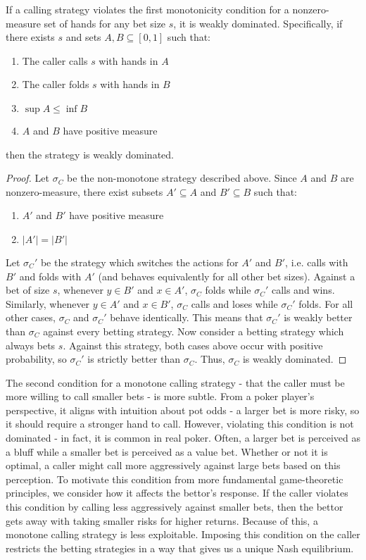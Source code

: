 \documentclass[../../main/main.tex]{subfiles}
\begin{document}
\begin{lemma}
    \label{lem:monotone_dominated}
    If a calling strategy violates the first monotonicity condition for a nonzero-measure set of hands for any bet size $s$, it is weakly dominated. Specifically, if there exists $s$ and sets $A, B \subseteq [0, 1]$ such that:
    \begin{enumerate}
        \item The caller calls $s$ with hands in $A$
        \item The caller folds $s$ with hands in $B$
        \item $\sup A \leq \inf B$
        \item $A$ and $B$ have positive measure
    \end{enumerate}
    then the strategy is weakly dominated.
\end{lemma}
\begin{proof}
    Let $\sigma_C$ be the non-monotone strategy described above. Since $A$ and $B$ are nonzero-measure, there exist subsets $A' \subseteq A$ and $B' \subseteq B$ such that:
    \begin{enumerate}
        \item $A'$ and $B'$ have positive measure
        \item $|A'| = |B'|$
    \end{enumerate}
    Let $\sigma_C'$ be the strategy which switches the actions for $A'$ and $B'$, i.e. calls with $B'$ and folds with $A'$ (and behaves equivalently for all other bet sizes). Against a bet of size $s$, whenever $y \in B'$ and $x \in A'$, $\sigma_C$ folds while $\sigma_C'$ calls and wins. Similarly, whenever $y \in A'$ and $x \in B'$, $\sigma_C$ calls and loses while $\sigma_C'$ folds. For all other cases, $\sigma_C$ and $\sigma_C'$ behave identically. This means that $\sigma_C'$ is weakly better than $\sigma_C$ against every betting strategy. Now consider a betting strategy which always bets $s$. Against this strategy, both cases above occur with positive probability, so $\sigma_C'$ is strictly better than $\sigma_C$. Thus, $\sigma_C$ is weakly dominated.
\end{proof}

The second condition for a monotone calling strategy - that the caller must be more willing to call smaller bets - is more subtle. From a poker player's perspective, it aligns with intuition about pot odds - a larger bet is more risky, so it should require a stronger hand to call. 
However, violating this condition is not dominated - in fact, it is common in real poker. Often, a larger bet is perceived as a bluff while a smaller bet is perceived as a value bet. Whether or not it is optimal, a caller might call more aggressively against large bets based on this perception.
To motivate this condition from more fundamental game-theoretic principles, we consider how it affects the bettor's response. If the caller violates this condition by calling less aggressively against smaller bets, then the bettor gets away with taking smaller risks for higher returns. Because of this, a monotone calling strategy is less exploitable. Imposing this condition on the caller restricts the betting strategies in a way that gives us a unique Nash equilibrium.
\end{document}
